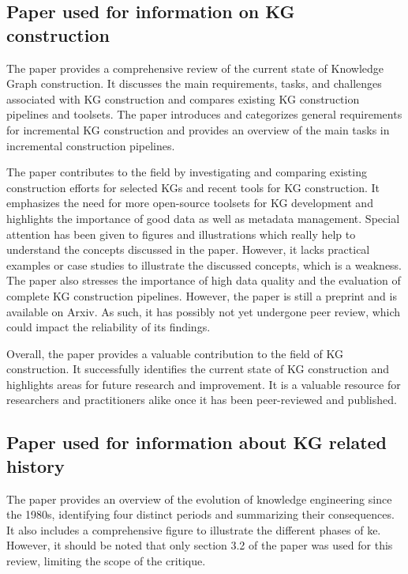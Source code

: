 \documentclass[11pt]{article} %
\begin{document}
\subsection{Paper used for information on KG construction}

The paper  provides a comprehensive review of the current state of Knowledge Graph construction. It discusses the main requirements, tasks, and challenges associated with KG construction and compares existing KG construction pipelines and toolsets. The paper introduces and categorizes general requirements for incremental KG construction and provides an overview of the main tasks in incremental construction pipelines.

The paper contributes to the field by investigating and comparing existing construction efforts for selected KGs and recent tools for KG construction. It emphasizes the need for more open-source toolsets for KG development and highlights the importance of good data as well as metadata management. Special attention has been given to figures and illustrations which really help to understand the concepts discussed in the paper. However, it lacks practical examples or case studies to illustrate the discussed concepts, which is a weakness. The paper also stresses the importance of high data quality and the evaluation of complete KG construction pipelines. However, the paper is still a preprint and is available on Arxiv. As such, it has possibly not yet undergone peer review, which could impact the reliability of its findings. 

Overall, the paper provides a valuable contribution to the field of KG construction. It successfully identifies the current state of KG construction and highlights areas for future research and improvement. It is a valuable resource for researchers and practitioners alike once it has been peer-reviewed and published.

\subsection{Paper used for information about KG related history}

The paper  provides an overview of the evolution of knowledge engineering since the 1980s, identifying four distinct periods and summarizing their consequences. It also includes a comprehensive figure to illustrate the different phases of \acrshort{ke}. However, it should be noted that only section 3.2 of the paper was used for this review, limiting the scope of the critique.
\end{document}
